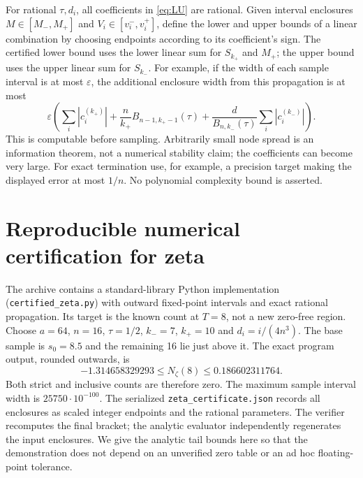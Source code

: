 \documentclass[11pt]{article}
\theoremstyle{remark}\newtheorem{remark}[theorem]{Remark}
\begin{document}
For rational $\tau,d_i$, all coefficients in \eqref{eq:LU} are rational. Given interval enclosures $M\in[M_-,M_+]$ and $V_i\in[v_i^-,v_i^+]$, define the lower and upper bounds of a linear combination by choosing endpoints according to its coefficient's sign. The certified lower bound uses the lower linear sum for $S_{k_+}$ and $M_+$; the upper bound uses the upper linear sum for $S_{k_-}$. For example, if the width of each sample interval is at most $\varepsilon$, the additional enclosure width from this propagation is at most
\[
 \varepsilon\left(\sum_i|c_i^{(k_+)}|+\frac n{k_+}B_{n-1,k_+-1}(\tau)
 +\frac d{B_{n,k_-}(\tau)}\sum_i|c_i^{(k_-)}|\right).
\]
This is computable before sampling. Arbitrarily small node spread is an information theorem, not a numerical stability claim; the coefficients can become very large. For exact termination use, for example, a precision target making the displayed error at most $1/n$. No polynomial complexity bound is asserted.

\section{Reproducible numerical certification for zeta}\label{sec:numeric}
The archive contains a standard-library Python implementation (\texttt{certified\_zeta.py}) with outward fixed-point intervals and exact rational propagation. Its target is the known count at $T=8$, not a new zero-free region. Choose $a=64$, $n=16$, $\tau=1/2$, $k_-=7$, $k_+=10$ and $d_i=i/(4n^3)$. The base sample is $s_0=8.5$ and the remaining 16 lie just above it. The exact program output, rounded outwards, is
\[
 \boxed{-1.314658329293\le N_\zeta(8)\le0.186602311764.}
\]
Both strict and inclusive counts are therefore zero. The maximum sample interval width is $25750\cdot10^{-100}$. The serialized \texttt{zeta\_certificate.json} records all enclosures as scaled integer endpoints and the rational parameters. The verifier recomputes the final bracket; the analytic evaluator independently regenerates the input enclosures. We give the analytic tail bounds here so that the demonstration does not depend on an unverified zero table or an ad hoc floating-point tolerance.
\end{document}
